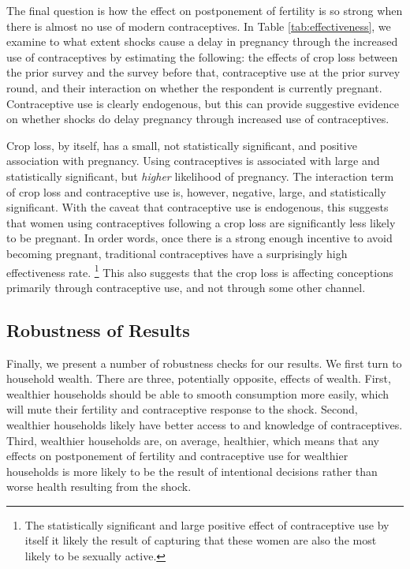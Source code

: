 \documentclass[letterpaper,12pt]{article}
\begin{document}

The final question is how the effect on postponement of fertility 
is so strong when there is almost no use of modern contraceptives.
In Table \ref{tab:effectiveness}, we examine to what extent shocks cause
a delay in pregnancy through the increased use of contraceptives by
estimating the following: 
the effects of crop loss between the prior survey and the
survey before that, contraceptive use at the prior survey round, and their
interaction on whether the respondent is currently pregnant.
Contraceptive use is clearly endogenous, but this can provide 
suggestive evidence on whether shocks do delay
pregnancy through increased use of contraceptives. 




Crop loss, by itself, has a small, not statistically significant,
and positive association with pregnancy.
Using contraceptives is associated with large and statistically 
significant, but \emph{higher} likelihood of pregnancy.
The interaction term of crop loss and contraceptive use is,
however, negative, large, and statistically significant. 
With the caveat that contraceptive use is endogenous, this suggests
that women using contraceptives following a crop loss are significantly 
less likely to be pregnant. 
In order words, once there is a strong enough incentive to avoid
becoming pregnant, traditional contraceptives have a surprisingly high
effectiveness rate.%
\footnote{
The statistically significant and large positive effect of 
contraceptive use by itself it likely the result of capturing
that these women are also the most likely to be sexually active.
}
This also suggests that the crop loss is affecting conceptions primarily 
through contraceptive use, and not through some other channel. 



\subsection{Robustness of Results}

Finally, we present a number of robustness checks for our results.
We first turn to household wealth.
There are three, potentially opposite, effects of wealth.
First,
wealthier households should be able to smooth consumption more easily,
which will mute their fertility and contraceptive response to the shock.
Second, 
wealthier households likely have better access to and knowledge
of contraceptives.
Third, 
wealthier households are, on average, healthier, which means that any 
effects on postponement of fertility and contraceptive use for wealthier
households is more likely to be the result of intentional decisions 
rather than worse health resulting from the shock.
\end{document}
